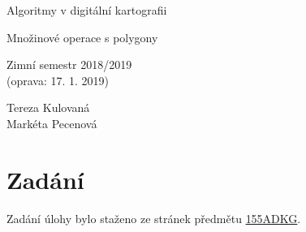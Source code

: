 \documentclass[a4paper, 12pt]{article}
\begin{document}
\begin{titlepage}
\begin{center}
\Huge
\vspace*{4.5cm}
Algoritmy v digitální kartografii\\
\vspace{0.2cm}

\Large  
Množinové operace s polygony\\
\vspace{0.2cm}

\normalsize  
Zimní semestr 2018/2019\\
(oprava: 17. 1. 2019)
\vspace{14cm}
\end{center}

\begin{flushright}
\Large
Tereza Kulovaná \\
Markéta Pecenová \\
\end{flushright}

\end{titlepage}


\pagestyle{plain}     %
\setcounter{page}{1}  %

\tableofcontents
\newpage

\section{Zadání}
Zadání úlohy bylo staženo ze stránek předmětu \href{https://web.natur.cuni.cz/~bayertom/index.php/teaching/algoritmy-v-digitalni-kartografii}{155ADKG}.
\end{document}
